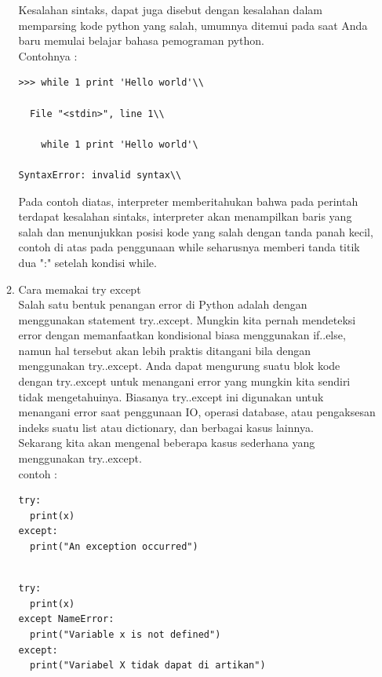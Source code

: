\begin{enumerate}
\begin{enumerate}
Kesalahan sintaks, dapat juga disebut dengan kesalahan dalam memparsing kode
python yang salah, umumnya ditemui pada saat Anda baru memulai belajar bahasa
pemograman python.\\ Contohnya :\\
\begin{verbatim}
>>> while 1 print 'Hello world'\\

  File "<stdin>", line 1\\

    while 1 print 'Hello world'\             

SyntaxError: invalid syntax\\
\end{verbatim}


Pada contoh diatas, interpreter memberitahukan bahwa pada perintah terdapat
kesalahan sintaks, interpreter akan menampilkan baris yang salah dan
menunjukkan posisi kode yang salah dengan tanda panah kecil, contoh di atas pada
penggunaan while seharusnya memberi tanda titik dua ":" setelah kondisi while.

\item Cara memakai try except\\
Salah satu bentuk penangan error di Python adalah dengan menggunakan statement try..except. Mungkin kita pernah mendeteksi error dengan memanfaatkan kondisional biasa menggunakan if..else, namun hal tersebut akan lebih praktis ditangani bila dengan menggunakan try..except. Anda dapat mengurung suatu blok kode dengan try..except untuk menangani error yang mungkin kita sendiri tidak mengetahuinya. Biasanya try..except ini digunakan untuk menangani error saat penggunaan IO, operasi database, atau pengaksesan indeks suatu list atau dictionary, dan berbagai kasus lainnya.\\

Sekarang kita akan mengenal beberapa kasus sederhana yang menggunakan try..except.\\
contoh :
\begin{verbatim}
try:
  print(x)
except:
  print("An exception occurred")
  
\end{verbatim}

\begin{verbatim}
try:
  print(x)
except NameError:
  print("Variable x is not defined")
except:
  print("Variabel X tidak dapat di artikan")
\end{verbatim}

\end{enumerate}
\end{enumerate}
